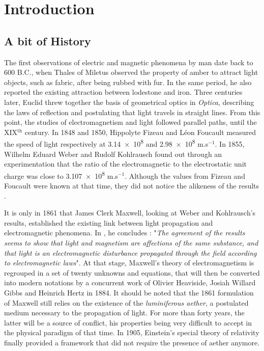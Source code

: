 \chapter{Introduction}

\section{A bit of History}

The first observations of electric and magnetic phenomena by man date back to 600 B.C., when Thales of Miletus observed the property of amber to attract light objects, such as fabric, after being rubbed with fur. In the same period, he also reported the existing attraction between lodestone and iron. Three centuries later, Euclid threw together the basis of geometrical optics in \textit{Optica}, describing the laws of reflection and postulating that light travels in straight lines. From this point, the studies of electromagnetism and light followed parallel paths, until the XIX${}^{\text{th}}$ century. In 1848 and 1850, Hippolyte Fizeau and L\'eon Foucault measured the speed of light respectively at \num{3.14e8} and \num{2.98e8} m.s${}^{-1}$. In 1855, Wilhelm Eduard Weber and Rudolf Kohlrausch found out through an experimentation that the ratio of the electromagnetic to the electrostatic unit charge was close to \num{3.107e8} m.s${}^{-1}$. Although the values from Fizeau and Foucault were known at that time, they did not notice the alikeness of the results \cite{Keithley1}.

It is only in 1861 that James Clerk Maxwell, looking at Weber and Kohlrausch's results, established the existing link between light propagation and electromagnetic phenomena. In \cite{Maxwell1}, he concludes : "\emph{The agreement of the results seems to show that light and magnetism are affections of the same substance, and that light is an electromagnetic disturbance propagated through the field according to electromagnetic laws}". At that stage, Maxwell's theory of electromagnetism is regrouped in a set of twenty unknowns and equations, that will then be converted into modern notations by a concurrent work of Olivier Heaviside, Josiah Willard Gibbs and Heinrich Hertz in 1884. It should be noted that the 1861 formulation of Maxwell still relies on the existence of the \emph{luminiferous aether}, a postulated medium necessary to the propagation of light. For more than forty years, the latter will be a source of conflict, his properties being very difficult to accept in the physical paradigm of that time. In 1905, Einstein's special theory of relativity finally provided a framework that did not require the presence of aether anymore.

